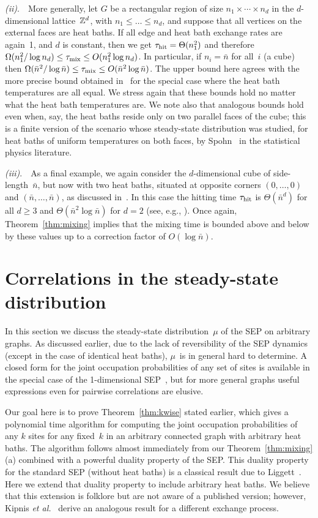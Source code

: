\documentclass[11pt]{article}
\theoremstyle{plain}
\theoremstyle{definition}
\theoremstyle{remark}
\numberwithin{equation}{section}
\newcommand{\tmix}{\tau_{\rm mix}}
\newcommand{\hit}{\tau_{\rm hit}}
\begin{document}
{\it (ii)}.\ \ More generally, let $G$ be a rectangular region of size $n_1\times\cdots\times n_d$ in the
$d$-dimensional lattice~${\Bbb Z}^d$, with $n_1\le\ldots\le n_d$, and suppose that all vertices on the external faces are 
heat baths.  If all edge and heat bath exchange rates are again~1, and $d$ is constant, then we get $\hit=\Theta(n_1^2)$
and therefore $\Omega(n_1^2/\log n_d)\le \tmix\le O(n_1^2\log n_d)$.
In particular, if $n_i=\bar n$ for all~$i$ (a cube) then $\Omega(\bar n^2/\log \bar n)\le \tmix\le O(\bar n^2\log \bar n)$.
The upper bound here agrees with the more precise bound obtained in~\cite{Salez23} for the special case where the 
heat bath temperatures are all equal. 
We stress again that these bounds hold no matter what the
heat bath temperatures are.  
We note also that analogous bounds hold even when, say, the heat baths reside
only on two parallel faces of the cube; this is a finite version of the scenario whose steady-state distribution was studied, for heat baths of uniform temperatures on both faces, by Spohn~\cite{Spohn83} in the statistical physics literature. 

{\it (iii)}.\ \ 
As a final example, we again consider the $d$-dimensional cube of side-length~$\bar n$, but now with two heat baths,
situated at opposite corners $(0,\ldots,0)$ and $(\bar n,\ldots,\bar n)$, as discussed in~\cite{Bodineauetal}.  In this case
the hitting time $\hit$ is $\Theta(\bar n^d)$ for all $d\ge 3$ and $\Theta(\bar n^2\log \bar n)$ for $d=2$ (see, e.g., 
\cite{AldousBrown,DoyleSnell}).  Once again, Theorem~\ref{thm:mixing}
implies that the mixing time is bounded above and below by these values up to a correction factor of $O(\log \bar n)$.

\section{Correlations in the steady-state distribution}\label{sec:correlations}
In this section we discuss the steady-state distribution~$\mu$ of the SEP on arbitrary graphs.
As discussed earlier, due to the lack of reversibility of the SEP dynamics (except in the
case of identical heat baths), $\mu$~is in general hard to determine.  A closed form for
the joint occupation probabilities of any set of sites
is available in the special case of the 1-dimensional SEP~\cite{Kingman69}, but for
more general graphs useful expressions even for pairwise correlations are elusive.

Our goal here is to prove Theorem~\ref{thm:kwise} stated earlier, which gives a polynomial
time algorithm for computing the joint occupation probabilities of any $k$ sites for any
fixed~$k$ in an arbitrary connected graph with arbitrary heat baths.  
The algorithm follows almost immediately from our Theorem~\ref{thm:mixing}(a)
combined with a powerful duality property of the SEP.  This duality property for the
standard SEP (without heat baths) is a classical result due to Liggett~\cite{Liggett85}.
Here we extend that duality property to include arbitrary heat baths.  We believe that this 
extension is folklore but are not aware of a published version; however, Kipnis 
{\it et al.}~\cite{KipnisMP82} derive an analogous result for a different exchange process.
\end{document}
